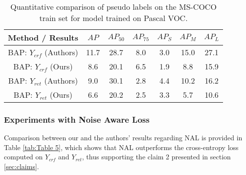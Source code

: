 \begin{table}[ht!]
\begin{center}
\begin{tabular}{ccccccc}
\toprule\toprule
Method / Results    & $AP$   & $AP_{50}$ & $AP_{75}$ & $AP_S$ & $AP_M$  & $AP_L$  \\ \midrule
BAP: $Y_{crf}$ \hspace{1mm} (Authors) & 11.7 & 28.7 & 8.0  & 3.0 & 15.0 & 27.1 \\ 
BAP: $Y_{crf}$ \hspace{1mm} (Ours)    & 8.6  & 20.1 & 6.5  & 1.9 & 8.8  & 15.9 \\ 
BAP: $Y_{ret}$ \hspace{1mm}(Authors) & 9.0  & 30.1 & 2.8  & 4.4 & 10.2 & 16.2 \\ 
BAP: $Y_{ret}$ \hspace{1mm} (Ours)    & 6.6  & 20.2 & 2.5  & 3.3 & 5.7  & 10.6 \\ \bottomrule
\end{tabular}
\vspace{1mm}
\caption{Quantitative comparison of pseudo labels on the MS-COCO train set for model trained on Pascal VOC.}
\label{tab:voc-coco}
\end{center}
\end{table}


\subsubsection{Experiments with Noise Aware Loss}

Comparison between our and the authors' results regarding NAL is provided in Table \ref{tab:Table 5}, which shows that NAL outperforms the cross-entropy loss computed on $Y_{crf}$ and $Y_{ret}$, thus supporting the claim 2 presented in section \ref{sec:claims}.

